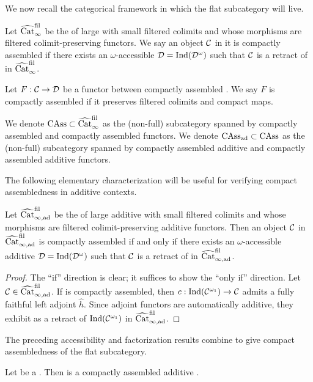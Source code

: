 \documentclass[a4paper,10pt, oneside]{amsart}
\begin{document}
	We now recall the categorical framework in which the flat subcategory will live. 
	\begin{de}
		Let $\widehat{\mathrm{Cat}}_{\infty}^{\mathrm{fil}}$ be the \infcat of large \infcats with small filtered colimits and whose morphisms are  filtered colimit-preserving functors. We say an object $\mathcal{C}$ in it is compactly assembled if there exists an $\omega$-accessible \infcat $\mathcal{D}=\mathrm{Ind}(\mathcal{D}^\omega)$ such that $\mathcal{C}$ is a retract of \mcd in $\widehat{\mathrm{Cat}}_{\infty}^{\mathrm{fil}}$. 
		
		Let $F: \mathcal{C}\to \mathcal{D}$ be a functor between compactly assembled \infcats. We say $F$ is compactly assembled if it preserves filtered colimits and compact maps. 
		
		We denote $\mathrm{CAss}\subset\widehat{\mathrm{Cat}}_{\infty}^{\mathrm{fil}}$ as the (non-full) subcategory spanned by compactly assembled \infcats and compactly assembled functors. We denote $\mathrm{CAss}_{\mathrm{ad}}\subset\mathrm{CAss}$ as the (non-full) subcategory spanned by compactly assembled additive \infcats and  compactly assembled additive functors.
	\end{de}
	The following elementary characterization will be useful for verifying compact assembledness in additive contexts.
	\begin{lem}\label{retraassad}
		Let $\widehat{\mathrm{Cat}}_{\infty,\mathrm{ad}}^{\mathrm{fil}}$ be the \infcat of large additive \infcats with small filtered colimits and whose morphisms are filtered colimit-preserving additive functors. Then an object $\mathcal{C}$ in $\widehat{\mathrm{Cat}}_{\infty,\mathrm{ad}}^{\mathrm{fil}}$ is compactly assembled if and only if there exists an $\omega$-accessible additive \infcat $\mathcal{D}=\mathrm{Ind}(\mathcal{D}^\omega)$ such that $\mathcal{C}$ is a retract of \mcd in $\widehat{\mathrm{Cat}}_{\infty,\mathrm{ad}}^{\mathrm{fil}}$.
	\end{lem}
	\begin{proof}
		The ``if'' direction is clear; it suffices to show the ``only if'' direction. Let $\mathcal{C}\in\widehat{\mathrm{Cat}}_{\infty,\mathrm{ad}}^{\mathrm{fil}}$. If \mcc is compactly assembled, then $c:\mathrm{Ind}(\mathcal{C}^{\omega_1})\to\mathcal{C}$ admits a fully faithful left adjoint $\hat{h}$. Since adjoint functors are automatically additive, they exhibit \mcc as a retract of $\mathrm{Ind}(\mathcal{C}^{\omega_1})$  in $\widehat{\mathrm{Cat}}_{\infty,\mathrm{ad}}^{\mathrm{fil}}$.
	\end{proof}
The preceding accessibility and factorization results combine to give compact assembledness of the flat subcategory.	
	\begin{thm}\label{flcompass}
		Let \mcc be a \dualaddinfcat. Then \cflat is a compactly assembled additive \infcat.
	\end{thm}
\end{document}
